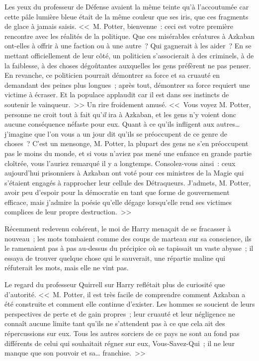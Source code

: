 Les yeux du professeur de Défense avaient la même teinte qu'à l'accoutumée car cette pâle lumière bleue était de la même couleur que ses iris, que ces fragments de glace à jamais saisis. <<~M. Potter, bienvenue~: ceci est votre première rencontre avec les réalités de la politique. Que ces misérables créatures à Azkaban ont-elles à offrir à une faction ou à une autre~? Qui gagnerait à les aider~? En se mettant officiellement de leur côté, un politicien s'associerait à des criminels, à de la faiblesse, à des choses dégoûtantes auxquelles les gens préfèrent ne pas penser. En revanche, ce politicien pourrait démontrer sa force et sa cruauté en demandant des peines plus longues~; après tout, démontrer sa force requiert une victime à écraser. Et la populace applaudit car il est dans ses instincts de soutenir le vainqueur.~>> Un rire froidement amusé. <<~Vous voyez M. Potter, personne ne croit tout à fait qu'\emph{il} ira à Azkaban, et les gens n'y voient donc aucune conséquence néfaste pour eux. Quant à ce qu'ils infligent aux autres… j'imagine que l'on vous a un jour dit qu'ils se préoccupent de ce genre de choses~? C'est un mensonge, M. Potter, la plupart des gens ne s'en préoccupent pas le moins du monde, et si vous n'aviez pas mené une enfance en grande partie cloîtrée, vous l'auriez remarqué il y a longtemps. Consolez-vous ainsi~: ceux aujourd'hui prisonniers à Azkaban ont voté pour ces ministres de la Magie qui s'étaient engagés à rapprocher leur cellule des Détraqueurs. J'admets, M. Potter, avoir peu d'espoir pour la démocratie en tant que forme de gouvernement efficace, mais j'admire la poésie qu'elle dégage lorsqu'elle rend ses victimes complices de leur propre destruction.~>>

Récemment redevenu cohérent, le moi de Harry menaçait de se fracasser à nouveau~; les mots tombaient comme des coups de marteau sur sa conscience, ils le ramenaient pas à pas au-dessus du précipice où se tapissait un vaste abysse~; il essaya de trouver quelque chose qui le sauverait, une répartie maline qui réfuterait les mots, mais elle ne vint pas.

Le regard du professeur Quirrell sur Harry reflétait plus de curiosité que d'autorité. <<~M. Potter, il est très facile de comprendre comment Azkaban a été construite et comment elle continue d'exister. Les hommes se soucient de leurs perspectives de perte et de gain propres~; leur cruauté et leur négligence ne connaît aucune limite tant qu'ils ne s'attendent pas à ce que cela ait des répercussions sur eux. Tous les autres sorciers de ce pays ne sont au fond pas différents de celui qui souhaitait régner sur eux, Vous-Savez-Qui~; il ne leur manque que son pouvoir et sa… franchise.~>>

